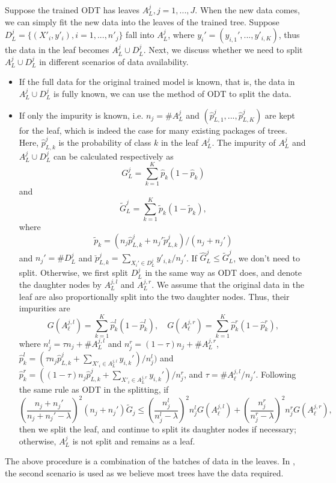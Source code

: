Suppose  the trained  ODT has leaves $ A_L^j, j = 1, ..., J$. When the new data comes, we can simply fit the new data into the leaves of the trained tree. Suppose  $ D_L^j  =\{ (X'_i, y'_i), i=1, ..., n'_j \}$ fall into $A_L^j $, where $ y_i' = (y_{i,1}', ..., y'_{i,K}) $, thus the data in the leaf becomes $A_L^j \cup  D_L^j $. Next, we discuss whether we need to split  $A_L^j \cup  D_L^j $ in different scenarios of data availability.
\begin{itemize}
	\item If the full data for the original trained model is known, that is, the data in $A_L^j \cup D_L^j $ is fully known, we can use the  method of ODT to split the data.

	\item If only the impurity is known, i.e.
	$ n_j = \# A_L^j $ and $ (\hat p^j_{L,1}, ..., \hat p^j_{L,K})$ are kept for the leaf, which is indeed the case for many existing packages of trees. Here, 
	$\hat p^j_{L,k} $ is the probability of class $ k $ in the leaf $ A_L^j$.
	The impurity of $ A_L^j $ and $A_L^j \cup  D_L^j $ can be calculated respectively as 
	$$
	G^j_L =     \sum_{k=1}^K \hat p_k (1- \hat p_k)
	$$
	and
	$$
	\tilde  G^j_L =   \sum_{k=1}^K \tilde p_k (1- \tilde p_k),
	$$
	where 
	$$
	\tilde  p_k = (n_j \hat p^j_{L,k} + n_j' \check p^j_{L,k})/(n_j + n_j')
	$$
	and  $ n_j' = \# D_L^j $ and $ \check p^j_{L,k} = \sum_{X_i' \in D_L^j} y'_{i, k}/n_j' $.
	If  $ \hat G_L^j \le \tilde G_L^j$, we don't need to split. Otherwise, we first split $  D_L^j  $ in the same way as ODT  does, and denote the daughter nodes by  
	$  A_L^{j, l}  $ and $  A_L^{j, r}  $. We assume that the original data in the leaf are also proportionally split into the two daughter nodes. Thus, their impurities are 
	$$
	G( A_\ell^{j, l}) =  \sum_{k=1}^K \hat p_k^l (1- \hat p^l_k), \quad 
	G( A_\ell^{j, r}) =  \sum_{k=1}^K \hat p^r_k (1- \hat p^r_k),
	$$
	where $ n_j^l = \tau n_j + \# A_L^{j, l}$ and $ n_j^r = (1-\tau) n_j + \# A_L^{j, r}$, $ \hat p_k^l = (\tau n_j \hat p^j_{L,k} + 
	\sum_{X'_i \in A_L^{j, l}} y_{i,k}')/ n_j^l) $ and $ \hat p_k^r = ((1-\tau) n_j \hat p^j_{L,k} + 
	\sum_{X'_i \in A_L^{j, r}} y_{i,k}')/n_j^r $, and  $ \tau = \# A_\ell^{j, l}/n_j' $.
	Following the same rule as ODT in the splitting, if 
	$$
	\left(\frac{n_j+n_j'}{n_j+n_j' -\lambda}\right)^2(n_j+n_j')\tilde G_j \le
	\left(\frac{n_j^l}{n_j^l -\lambda}\right)^2 n_j^l G( A_\ell^{j, l})
	+  \left(\frac{  n_j^r}{ n_j^r -\lambda}\right)^2 n_j^r G( A_\ell^{j, r}),
	$$
	then we split the leaf, and continue to split its daughter nodes if necessary; otherwise, $ A_L^j $ is not split and remains as a leaf.
\end{itemize}
The above procedure is a combination of the batches of data in the leaves. In , the second scenario is used as we believe most trees have the data required.

